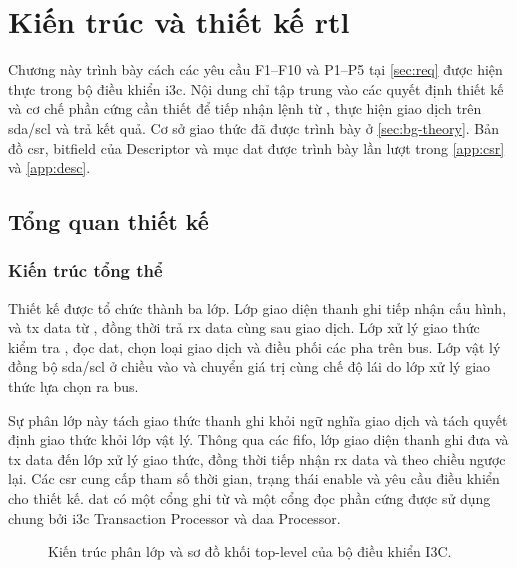 \chapter{Kiến trúc và thiết kế \texorpdfstring{\gls{rtl}}{RTL}}
\label{ch:architecture}

Chương này trình bày cách các yêu cầu F1--F10 và P1--P5 tại \cref{sec:req} được hiện thực trong bộ điều khiển \gls{i3c}. Nội dung chỉ tập trung vào các quyết định thiết kế và cơ chế phần cứng cần thiết để tiếp nhận lệnh từ \Host{}, thực hiện giao dịch trên \gls{sda}/\gls{scl} và trả kết quả. Cơ sở giao thức đã được trình bày ở \cref{sec:bg-theory}. Bản đồ \gls{csr}, bitfield của Descriptor và mục \gls{dat} được trình bày lần lượt trong \cref{app:csr} và \cref{app:desc}.

\section{Tổng quan thiết kế}
\label{sec:arch-overview}

\subsection{Kiến trúc tổng thể}
\label{sec:arch-layers}
\label{sec:arch-block}

Thiết kế được tổ chức thành ba lớp. Lớp giao diện thanh ghi tiếp nhận cấu hình, \CommandDescriptor{} và \gls{tx} data từ \Host{}, đồng thời trả \acrshort{rx} data cùng \ResponseDescriptor{} sau giao dịch. Lớp xử lý giao thức kiểm tra \CommandDescriptor{}, đọc \gls{dat}, chọn loại giao dịch và điều phối các pha trên bus. Lớp vật lý đồng bộ \gls{sda}/\gls{scl} ở chiều vào và chuyển giá trị cùng chế độ lái do lớp xử lý giao thức lựa chọn ra bus.

Sự phân lớp này tách giao thức thanh ghi khỏi ngữ nghĩa giao dịch và tách quyết định giao thức khỏi lớp vật lý. Thông qua các \gls{fifo}, lớp giao diện thanh ghi đưa \CommandDescriptor{} và \gls{tx} data đến lớp xử lý giao thức, đồng thời tiếp nhận \acrshort{rx} data và \ResponseDescriptor{} theo chiều ngược lại. Các \gls{csr} cung cấp tham số thời gian, trạng thái enable và yêu cầu điều khiển cho thiết kế. \gls{dat} có một cổng ghi từ \Host{} và một cổng đọc phần cứng được sử dụng chung bởi \gls{i3c} Transaction Processor và \acrshort{daa} Processor.

\begin{figure}[!ht]
	\centering
	
	\caption{Kiến trúc phân lớp và sơ đồ khối top-level của bộ điều khiển I3C.}
	\label{fig:arch-block}
\end{figure}

